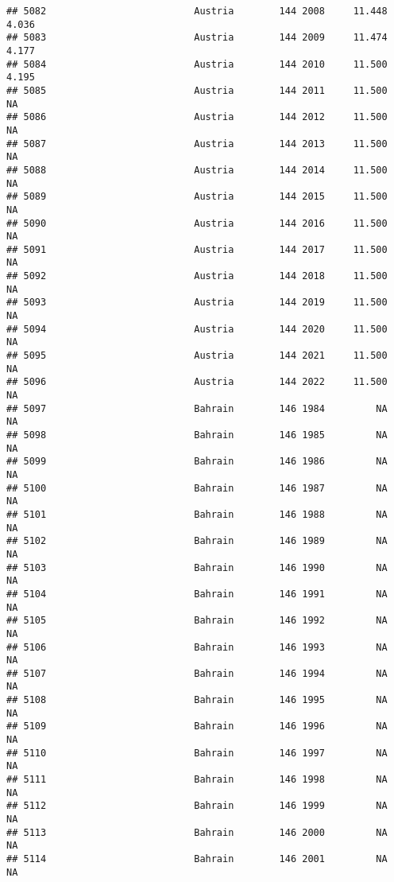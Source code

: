 \documentclass[
]{article}
\begin{document}
\begin{verbatim}
## 5082                          Austria        144 2008     11.448      4.036
## 5083                          Austria        144 2009     11.474      4.177
## 5084                          Austria        144 2010     11.500      4.195
## 5085                          Austria        144 2011     11.500         NA
## 5086                          Austria        144 2012     11.500         NA
## 5087                          Austria        144 2013     11.500         NA
## 5088                          Austria        144 2014     11.500         NA
## 5089                          Austria        144 2015     11.500         NA
## 5090                          Austria        144 2016     11.500         NA
## 5091                          Austria        144 2017     11.500         NA
## 5092                          Austria        144 2018     11.500         NA
## 5093                          Austria        144 2019     11.500         NA
## 5094                          Austria        144 2020     11.500         NA
## 5095                          Austria        144 2021     11.500         NA
## 5096                          Austria        144 2022     11.500         NA
## 5097                          Bahrain        146 1984         NA         NA
## 5098                          Bahrain        146 1985         NA         NA
## 5099                          Bahrain        146 1986         NA         NA
## 5100                          Bahrain        146 1987         NA         NA
## 5101                          Bahrain        146 1988         NA         NA
## 5102                          Bahrain        146 1989         NA         NA
## 5103                          Bahrain        146 1990         NA         NA
## 5104                          Bahrain        146 1991         NA         NA
## 5105                          Bahrain        146 1992         NA         NA
## 5106                          Bahrain        146 1993         NA         NA
## 5107                          Bahrain        146 1994         NA         NA
## 5108                          Bahrain        146 1995         NA         NA
## 5109                          Bahrain        146 1996         NA         NA
## 5110                          Bahrain        146 1997         NA         NA
## 5111                          Bahrain        146 1998         NA         NA
## 5112                          Bahrain        146 1999         NA         NA
## 5113                          Bahrain        146 2000         NA         NA
## 5114                          Bahrain        146 2001         NA         NA

\end{verbatim}
\end{document}

